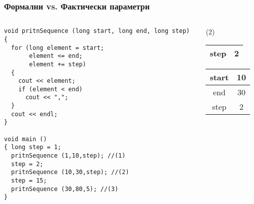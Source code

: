 \documentclass{beamer}
\begin{document}
\begin{frame}[fragile]
\frametitle{Формални vs. Фактически параметри}



\begin{columns}[t]
  \begin{column}{0.75\textwidth}

\begin{lstlisting}
void pritnSequence (long start, long end, long step)
{
  for (long element = start; 
       element <= end;  
       element += step)
  {
    cout << element;
    if (element < end)
      cout << ",";
  }  
  cout << endl;
}

void main ()
{ long step = 1;
  pritnSequence (1,10,step); //(1)
  step = 2;
  pritnSequence (10,30,step); //(2)
  step = 15;
  pritnSequence (30,80,5); //(3)
}
\end{lstlisting}


  \end{column}
  \begin{column}{0.25\textwidth}

    \alert{(2)}

    \begin{tabular}{|c|c|}
    step & 2 \\\hline

    \end{tabular}
    \pause
    \begin{tabular}{|c|c|}
    start & 10 \\\hline
    end & 30 \\\hline
    step & 2 \\\hline

    \end{tabular}
  \end{column}
\end{columns}

\end{frame}
\end{document}
